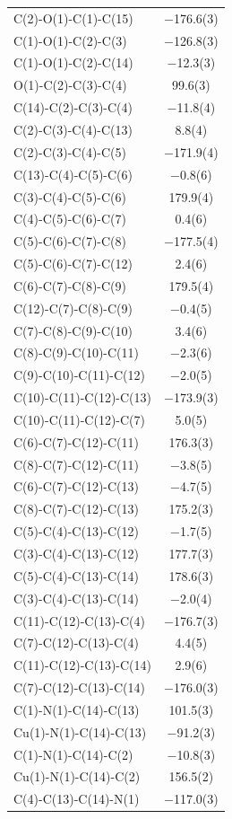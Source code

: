 \begin{center}
{\begin{supertabular}{p{1.8in}c}
C(2)-O(1)-C(1)-C(15)&$-$176.6(3)\\
C(1)-O(1)-C(2)-C(3)&$-$126.8(3)\\
C(1)-O(1)-C(2)-C(14)&$-$12.3(3)\\
O(1)-C(2)-C(3)-C(4)&99.6(3)\\
C(14)-C(2)-C(3)-C(4)&$-$11.8(4)\\
C(2)-C(3)-C(4)-C(13)&8.8(4)\\
C(2)-C(3)-C(4)-C(5)&$-$171.9(4)\\
C(13)-C(4)-C(5)-C(6)&$-$0.8(6)\\
C(3)-C(4)-C(5)-C(6)&179.9(4)\\
C(4)-C(5)-C(6)-C(7)&0.4(6)\\
C(5)-C(6)-C(7)-C(8)&$-$177.5(4)\\
C(5)-C(6)-C(7)-C(12)&2.4(6)\\
C(6)-C(7)-C(8)-C(9)&179.5(4)\\
C(12)-C(7)-C(8)-C(9)&$-$0.4(5)\\
C(7)-C(8)-C(9)-C(10)&3.4(6)\\
C(8)-C(9)-C(10)-C(11)&$-$2.3(6)\\
C(9)-C(10)-C(11)-C(12)&$-$2.0(5)\\
C(10)-C(11)-C(12)-C(13)&$-$173.9(3)\\
C(10)-C(11)-C(12)-C(7)&5.0(5)\\
C(6)-C(7)-C(12)-C(11)&176.3(3)\\
C(8)-C(7)-C(12)-C(11)&$-$3.8(5)\\
C(6)-C(7)-C(12)-C(13)&$-$4.7(5)\\
C(8)-C(7)-C(12)-C(13)&175.2(3)\\
C(5)-C(4)-C(13)-C(12)&$-$1.7(5)\\
C(3)-C(4)-C(13)-C(12)&177.7(3)\\
C(5)-C(4)-C(13)-C(14)&178.6(3)\\
C(3)-C(4)-C(13)-C(14)&$-$2.0(4)\\
C(11)-C(12)-C(13)-C(4)&$-$176.7(3)\\
C(7)-C(12)-C(13)-C(4)&4.4(5)\\
C(11)-C(12)-C(13)-C(14)&2.9(6)\\
C(7)-C(12)-C(13)-C(14)&$-$176.0(3)\\
C(1)-N(1)-C(14)-C(13)&101.5(3)\\
Cu(1)-N(1)-C(14)-C(13)&$-$91.2(3)\\
C(1)-N(1)-C(14)-C(2)&$-$10.8(3)\\
Cu(1)-N(1)-C(14)-C(2)&156.5(2)\\
C(4)-C(13)-C(14)-N(1)&$-$117.0(3)\\

\end{supertabular}}
\end{center}
